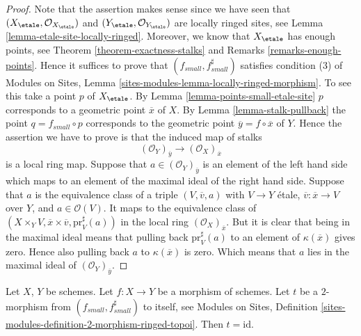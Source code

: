 \begin{proof}
Note that the assertion makes sense since we have seen that
$(X_\etale, \mathcal{O}_{X_\etale})$ and
$(Y_\etale, \mathcal{O}_{Y_\etale})$
are locally ringed sites, see
Lemma \ref{lemma-etale-site-locally-ringed}.
Moreover, we know that $X_\etale$ has enough points, see
Theorem \ref{theorem-exactness-stalks}
and
Remarks \ref{remarks-enough-points}.
Hence it suffices to prove that $(f_{small}, f_{small}^\sharp)$
satisfies condition (3) of
Modules on Sites,
Lemma \ref{sites-modules-lemma-locally-ringed-morphism}.
To see this take a point $p$ of $X_\etale$. By
Lemma \ref{lemma-points-small-etale-site}
$p$ corresponds to a geometric point $\overline{x}$ of $X$.
By
Lemma \ref{lemma-stalk-pullback}
the point $q = f_{small} \circ p$ corresponds to the
geometric point $\overline{y} = f \circ \overline{x}$ of $Y$.
Hence the assertion we have to prove is that the induced map
of stalks
$$
(\mathcal{O}_Y)_{\overline{y}} \longrightarrow (\mathcal{O}_X)_{\overline{x}}
$$
is a local ring map. Suppose that $a \in (\mathcal{O}_Y)_{\overline{y}}$
is an element of the left hand side which maps to an element of the maximal
ideal of the right hand side. Suppose that $a$ is the equivalence class
of a triple $(V, \overline{v}, a)$ with $V \to Y$ \'etale,
$\overline{v} : \overline{x} \to V$ over $Y$, and $a \in \mathcal{O}(V)$.
It maps to the equivalence class of
$(X \times_Y V, \overline{x} \times \overline{v}, \text{pr}_V^\sharp(a))$
in the local ring $(\mathcal{O}_X)_{\overline{x}}$. But it is clear that
being in the maximal ideal means that pulling back $\text{pr}_V^\sharp(a)$
to an element of $\kappa(\overline{x})$ gives zero. Hence also pulling back
$a$ to $\kappa(\overline{x})$ is zero. Which means that $a$ lies in the
maximal ideal of $(\mathcal{O}_Y)_{\overline{y}}$.
\end{proof}

\begin{lemma}
\label{lemma-2-morphism}
Let $X$, $Y$ be schemes. Let $f : X \to Y$ be a morphism of schemes.
Let $t$ be a $2$-morphism from $(f_{small}, f_{small}^\sharp)$ to itself, see
Modules on Sites,
Definition \ref{sites-modules-definition-2-morphism-ringed-topoi}.
Then $t = \text{id}$.
\end{lemma}

